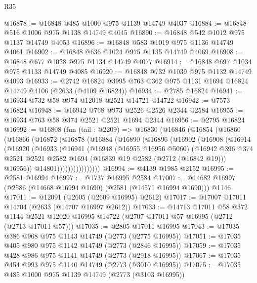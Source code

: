\begin{lexlean}{R35}
\begin{coremodule}
@16878 := @16848 @485 @1000 @975 @1139 @14749 @4037
@16884 := @16848 @516 @1006 @975 @1138 @14749 @4045
@16890 := @16848 @542 @1012 @975 @1137 @14749 @4053
@16896 := @16848 @583 @1019 @975 @1136 @14749 @4061
@16902 := @16848 @636 @1024 @975 @1135 @14749 @4069
@16908 := @16848 @677 @1028 @975 @1134 @14749 @4077
@16914 := @16848 @697 @1034 @975 @1133 @14749 @4085
@16920 := @16848 @732 @1039 @975 @1132 @14749 @4093
@16933 := @2742 @16824 @3995 @763 @362 @975 @1131 @1694 @16824 @14749 @4106 (@2633 (@4109 @16824))
@16934 := @2785 @16824
@16941 := @16934 @732 @58 @974 @12018 @2521 @14721 @14722
@16942 := @7573 @16824
@16948 := @16942 @768 @973 @2526 @2526 @2344 @2584
@16955 := @16934 @763 @58 @374 @2521 @2521 @1694 @2344
@16956 := @2795 @16824
@16992 := @16808
    (fun (tail : @2209) =>
    @16830
      (@16846
        (@16854
          (@16860
            (@16866
              (@16872
                (@16878
                  (@16884
                    (@16890
                      (@16896
                        (@16902
                          (@16908
                            (@16914
                              (@16920
                                (@16933
                                  (@16941
                                    (@16948
                                      (@16955 @16956 @5060)
                                      (@16942
                                        @396
                                        @374
                                        @2521
                                        @2521
                                        @2582
                                        @1694
                                        (@16839 @19 @2582 (@2712 (@16842 @19)))
                                        @16956))
                                    @14801))))))))))))))))
@16994 := @4139 @1985 @2152
@16995 := @2581 @16994
@16997 := @1737 @16995 @2584
@17007 := @14682 @16997 (@2586 (@14668 @16994 @1690) (@2581 (@14571 @16994 @1690))) @1146
@17011 := @12091 (@2605 (@2609 @16995) @2612)
@17017 := @17007 @17011 @14704 (@2633 (@14707 @16997 @2612))
@17033 := @14713
    @17011
    @58
    @372
    @1144
    @2521
    @12020
    @16995
    @14722
    (@2707 @17011 @57 @16995 (@2712 (@2713 @17011 @57)))
@17035 := @2805 @17011 @16995
@17043 := @17035 @386 @968 @975 @1143 @14749 (@2773 (@2775 @16995))
@17051 := @17035 @405 @980 @975 @1142 @14749 (@2773 (@2846 @16995))
@17059 := @17035 @428 @986 @975 @1141 @14749 (@2773 (@2918 @16995))
@17067 := @17035 @454 @993 @975 @1140 @14749 (@2773 (@3010 @16995))
@17075 := @17035 @485 @1000 @975 @1139 @14749 (@2773 (@3103 @16995))

\end{coremodule}
\end{lexlean}
